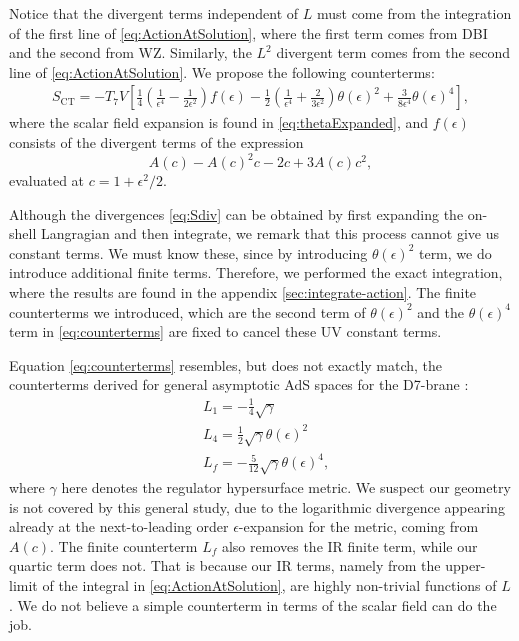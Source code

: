 Notice that the divergent terms independent of $L$ must come from the integration of the first line of \eqref{eq:ActionAtSolution}, where the first term comes from DBI and the second from WZ. Similarly, the $L^2$ divergent term comes from the second line of \eqref{eq:ActionAtSolution}. 
We propose the following counterterms:
\begin{align}\label{eq:counterterms}
 S_\text{CT} =  -T_7 V \left[ 
  \frac{1}{4} \left(\frac{1}{\epsilon ^4}-\frac{1}{2 \epsilon ^2}\right) f(\epsilon)
   -\frac{1}{2}\left(\frac{1}{\epsilon ^4}+\frac{2}{3 \epsilon ^2}\right) \theta (\epsilon)^2 + \frac{3}{8 \epsilon^4} \theta (\epsilon)^4
   \right],
\end{align}
where the scalar field expansion is found in \eqref{eq:thetaExpanded}, and
$f(\epsilon)$ consists of the divergent terms of the expression 
\begin{equation}
A(c)-A(c)^2 c - 2 c + 3 A(c) c^2,
\end{equation}
evaluated at $c=1+\epsilon^2/2$. 


Although the divergences \eqref{eq:Sdiv} can be obtained by first expanding the on-shell Langragian and then integrate, we remark that this process cannot give us constant terms. We must know these, since by introducing $\theta(\epsilon)^2$ term, we do introduce additional finite terms. Therefore, we performed the exact integration, where the results are found in the appendix \ref{sec:integrate-action}. The finite counterterms we introduced, which are the second term of $\theta(\epsilon)^2$ and the $\theta(\epsilon)^4$ term in \eqref{eq:counterterms} are fixed to cancel these UV constant terms.


Equation \eqref{eq:counterterms} resembles, but does not exactly match, the counterterms derived for general asymptotic AdS spaces for the D7-brane \cite{Karch:2005ms}:
\begin{align*}
& L_{1}=-\frac{1}{4} \sqrt{\gamma} \\
& L_{4}=\frac{1}{2} \sqrt{\gamma} \theta(\epsilon)^2 \\
& L_{f}= -\frac{5}{12}\sqrt{\gamma} \theta(\epsilon)^4,
\end{align*}
where $\gamma$ here denotes the regulator hypersurface metric. We suspect our geometry is not covered by this general study, due to the logarithmic divergence appearing already at the next-to-leading order $\epsilon$-expansion for the metric, coming from $A(c)$. The finite counterterm $L_f$ also removes the IR finite term, while our quartic term does not. That is because our IR terms, namely from the upper-limit of the integral in \eqref{eq:ActionAtSolution}, are highly non-trivial functions of $L$. We do not believe a simple counterterm in terms of the scalar field can do the job. 

